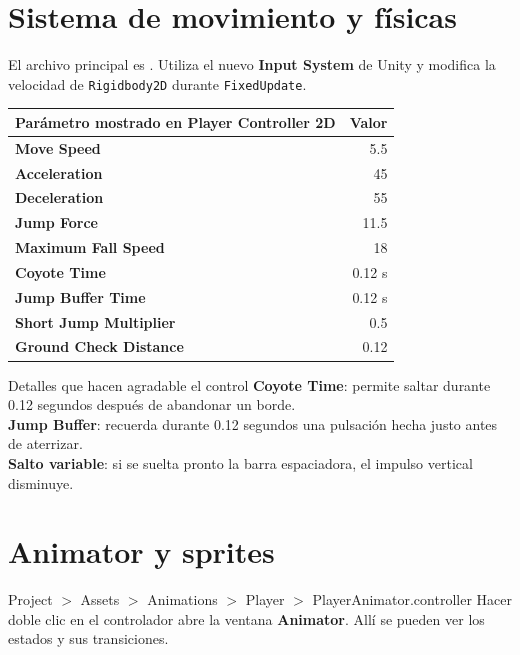 \documentclass[11pt,a4paper]{article}
\begin{document}
\section{Sistema de movimiento y físicas}

El archivo principal es . Utiliza el nuevo \textbf{Input System} de Unity y modifica la velocidad de \texttt{Rigidbody2D} durante \texttt{FixedUpdate}.

\begin{tabularx}{\textwidth}{>{\bfseries}X r}
\toprule
Parámetro mostrado en Player Controller 2D & Valor \\
\midrule
Move Speed & 5.5 \\
Acceleration & 45 \\
Deceleration & 55 \\
Jump Force & 11.5 \\
Maximum Fall Speed & 18 \\
Coyote Time & 0.12 s \\
Jump Buffer Time & 0.12 s \\
Short Jump Multiplier & 0.5 \\
Ground Check Distance & 0.12 \\
\bottomrule
\end{tabularx}

\begin{gamebox}{Detalles que hacen agradable el control}
\textbf{Coyote Time}: permite saltar durante 0.12 segundos después de abandonar un borde.\\
\textbf{Jump Buffer}: recuerda durante 0.12 segundos una pulsación hecha justo antes de aterrizar.\\
\textbf{Salto variable}: si se suelta pronto la barra espaciadora, el impulso vertical disminuye.
\end{gamebox}

\section{Animator y sprites}

\begin{unitybox}{Project $>$ Assets $>$ Animations $>$ Player $>$ PlayerAnimator.controller}
Hacer doble clic en el controlador abre la ventana \textbf{Animator}. Allí se pueden ver los estados y sus transiciones.
\end{unitybox}
\end{document}
